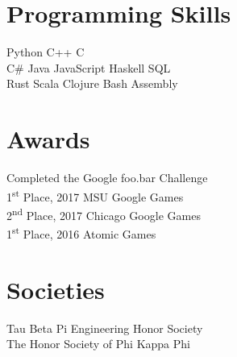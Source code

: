 \documentclass[]{deedy-resume-openfont-rileyannis}
\begin{document}
\begin{minipage}[t]{0.33\textwidth}
\section{Programming Skills}
Python \textbullet{} C++ \textbullet{} C\\
C\# \textbullet{} Java \textbullet{} JavaScript \textbullet{} Haskell \textbullet{} SQL\\
Rust \textbullet{} Scala \textbullet{} Clojure \textbullet{} Bash \textbullet{} Assembly\\
\sectionsep


\section{Awards}
Completed the Google foo.bar Challenge\\
1\textsuperscript{st} Place, 2017 MSU Google Games\\
2\textsuperscript{nd} Place, 2017 Chicago Google Games\\
1\textsuperscript{st} Place, 2016 Atomic Games\\
\sectionsep


\section{Societies} 
Tau Beta Pi Engineering Honor Society\\
The Honor Society of Phi Kappa Phi\\
\sectionsep


%
%

\end{minipage} 
\hfill
\end{document}
